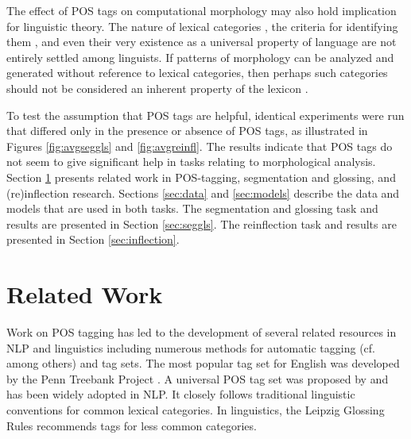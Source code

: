 The effect of POS tags on computational morphology may also hold implication for linguistic theory. 
The nature of lexical categories \citep{rauh_syntactic_2010}, the criteria for identifying them  \citep{croft_parts_2000}, and even their very existence as a universal property of language \citep{gil_word_2005} are not entirely settled among linguists. 
If patterns of morphology can be analyzed and generated without reference to lexical categories, then perhaps such categories should not be considered an inherent property of the lexicon \citep{rauh_linguistic_2016}.

To test the assumption that POS tags are helpful, identical experiments were run that differed only in the presence or absence of POS tags, as illustrated in Figures \ref{fig:avgseggls} and \ref{fig:avgreinfl}. The results indicate that POS tags do not seem to give significant help in tasks relating to morphological analysis. Section \ref{sec:related} presents related work in POS-tagging, segmentation and glossing, and (re)inflection research. Sections \ref{sec:data} and \ref{sec:models} describe the data and models that are used in both tasks. The segmentation and glossing task and results are presented in Section \ref{sec:seggls}. The reinflection task and results are presented in Section \ref{sec:inflection}.  


\section{Related Work}
\label{sec:related}

Work on POS tagging has led to the development of several related resources in NLP and linguistics including numerous methods for automatic tagging (cf. \citet{KUPIEC1992225,toutanova2008a} among others) and tag sets. The most popular tag set for English was developed by the Penn Treebank Project \cite{penn_mitchell_1993}. A universal POS tag set was proposed by \cite{petrov-etal-2012-universal} and has been widely adopted in NLP. It closely follows traditional linguistic conventions for common lexical categories. In linguistics, the Leipzig Glossing Rules \citep{leipzig_glossing_rules} recommends tags for less common categories.

